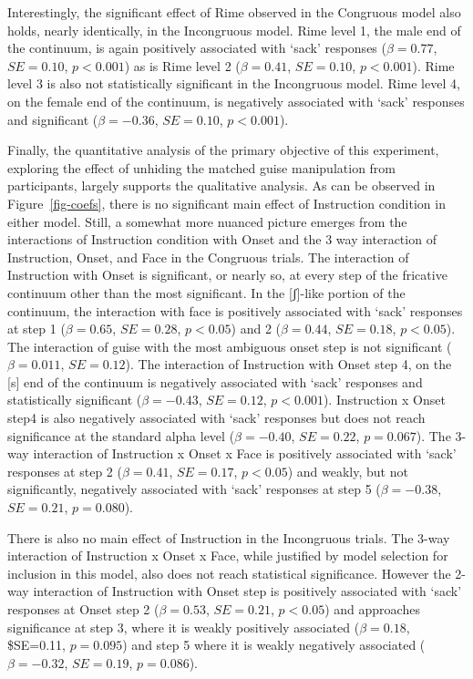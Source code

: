 \documentclass[
  letterpaper,
  DIV=11,
  numbers=noendperiod]{scrartcl}
\begin{document}
Interestingly, the significant effect of Rime observed in the Congruous
model also holds, nearly identically, in the Incongruous model. Rime
level 1, the male end of the continuum, is again positively associated
with `sack' responses (\(β=0.77\), \(SE=0.10\), \(p < 0.001\)) as is
Rime level 2 (\(β=0.41\), \(SE=0.10\), \(p < 0.001\)). Rime level 3 is
also not statistically significant in the Incongruous model. Rime level
4, on the female end of the continuum, is negatively associated with
`sack' responses and significant (\(β=-0.36\), \(SE=0.10\),
\(p < 0.001\)).

Finally, the quantitative analysis of the primary objective of this
experiment, exploring the effect of unhiding the matched guise
manipulation from participants, largely supports the qualitative
analysis. As can be observed in Figure~\ref{fig-coefs}, there is no
significant main effect of Instruction condition in either model. Still,
a somewhat more nuanced picture emerges from the interactions of
Instruction condition with Onset and the 3 way interaction of
Instruction, Onset, and Face in the Congruous trials. The interaction of
Instruction with Onset is significant, or nearly so, at every step of
the fricative continuum other than the most significant. In the
{[}ʃ{]}-like portion of the continuum, the interaction with face is
positively associated with `sack' responses at step 1 (\(β=0.65\),
\(SE=0.28\), \(p < 0.05\)) and 2 (\(β=0.44\), \(SE=0.18\),
\(p < 0.05\)). The interaction of guise with the most ambiguous onset
step is not significant (\(β=0.011\), \(SE=0.12\)). The interaction of
Instruction with Onset step 4, on the {[}s{]} end of the continuum is
negatively associated with `sack' responses and statistically
significant (\(β=-0.43\), \(SE=0.12\), \(p < 0.001\)). Instruction x
Onset step4 is also negatively associated with `sack' responses but does
not reach significance at the standard alpha level (\(β=-0.40\),
\(SE=0.22\), \(p = 0.067\)). The 3-way interaction of Instruction x
Onset x Face is positively associated with `sack' responses at step 2
(\(β=0.41\), \(SE=0.17\), \(p < 0.05\)) and weakly, but not
significantly, negatively associated with `sack' responses at step 5
(\(β=-0.38\), \(SE=0.21\), \(p = 0.080\)).

There is also no main effect of Instruction in the Incongruous trials.
The 3-way interaction of Instruction x Onset x Face, while justified by
model selection for inclusion in this model, also does not reach
statistical significance. However the 2-way interaction of Instruction
with Onset step is positively associated with `sack' responses at Onset
step 2 (\(β=0.53\), \(SE=0.21\), \(p < 0.05\)) and approaches
significance at step 3, where it is weakly positively associated
(\(β=0.18\), \$SE=0.11, \(p = 0.095\)) and step 5 where it is weakly
negatively associated (\(β=-0.32\), \(SE=0.19\), \(p = 0.086\)).
\end{document}
